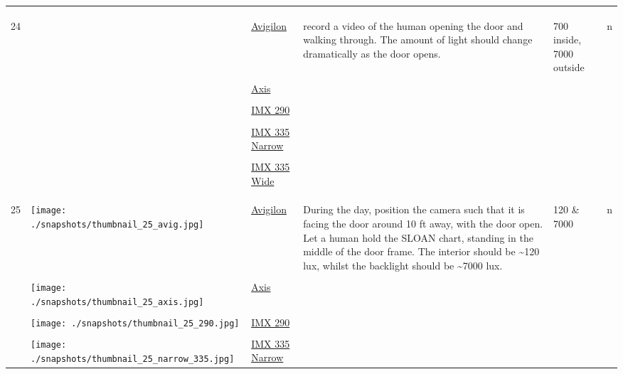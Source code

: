 \documentclass{article}%
\begin{document}
\begin{longtabu}{m{2.5cm} m{4cm} m{2cm} m{4cm} m{2cm} m{2cm}}
&&&&&\\%
&&&&&\\%
\hline%
&&&&&\\%
24&&\href{https://drive.google.com/file/d/1KPW1iFRglgTPQaXkRlsUPpdjSVrrU_T_/view?usp=sharing}{Avigilon}&record a video of the human opening the door and walking through. The amount of light should change dramatically as the door opens.&700 inside, 7000 outside&n\\%
&&&&&\\%
&&\href{https://drive.google.com/file/d/1Tc-VdHU0osDnvbnHajqHonehkyZojvW2/view?usp=sharing}{Axis}&&&\\%
&&&&&\\%
&&\href{https://drive.google.com/file/d/1k_Xo_q9Ldju17LUaAUg3N2GJYu-PmtdS/view?usp=sharing}{IMX 290}&&&\\%
&&&&&\\%
&&\href{https://drive.google.com/file/d/1I_7PAGAjakbe8yZqiDiB3ksvVR5labWO/view?usp=sharing}{IMX 335 Narrow}&&&\\%
&&&&&\\%
&&\href{https://drive.google.com/file/d/1EAYG8vQJDFLacdg6g0EUFO7croadEjR0/view?usp=sharing}{IMX 335 Wide}&&&\\%
&&&&&\\%
&&&&&\\%
\hline%
&&&&&\\%
25&\texttt{[image: ./snapshots/thumbnail\_25\_avig.jpg]}&\href{https://drive.google.com/file/d/1lv3zSZpoQ6aVCikEorZkEftZq-EzGMFj/view?usp=sharing}{Avigilon}&During the day, position the camera such that it is facing the door around 10 ft away, with the door open. Let a human hold the SLOAN chart, standing in the middle of the door frame. The interior should be \textasciitilde{}120 lux, whilst the backlight should be \textasciitilde{}7000 lux.&120 \& 7000&n\\%
&&&&&\\%
&\texttt{[image: ./snapshots/thumbnail\_25\_axis.jpg]}&\href{https://drive.google.com/file/d/1ON2mneT5gTb-Y2wcYqsojQhlrC5ofVdA/view?usp=sharing}{Axis}&&&\\%
&&&&&\\%
&\texttt{[image: ./snapshots/thumbnail\_25\_290.jpg]}&\href{https://drive.google.com/file/d/1GSdhts3Y4BT9y1tMM7VcQX0-blKp8bXr/view?usp=sharing}{IMX 290}&&&\\%
&&&&&\\%
&\texttt{[image: ./snapshots/thumbnail\_25\_narrow\_335.jpg]}&\href{https://drive.google.com/file/d/1S38AY-Ci6Aw6TpoAnYwLRW4MCcFnx9FE/view?usp=sharing}{IMX 335 Narrow}&&&\\%

\end{longtabu}
\end{document}
